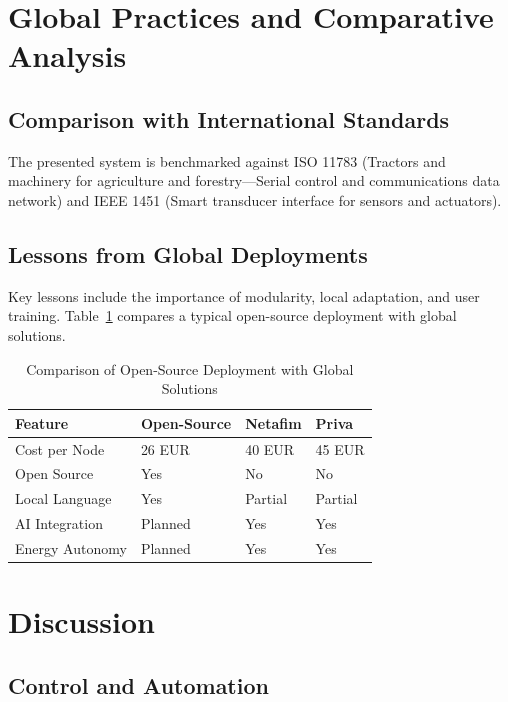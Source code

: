 \documentclass[12pt,a4paper]{article}
\begin{document}
\section{Global Practices and Comparative Analysis}
\subsection{Comparison with International Standards}
The presented system is benchmarked against ISO 11783 (Tractors and machinery for agriculture and forestry—Serial control and communications data network) and IEEE 1451 (Smart transducer interface for sensors and actuators).

\subsection{Lessons from Global Deployments}
Key lessons include the importance of modularity, local adaptation, and user training. Table~\ref{tab:compare} compares a typical open-source deployment with global solutions.

\begin{table}[H]
    \centering
    \caption{Comparison of Open-Source Deployment with Global Solutions}
    \begin{tabular}{@{}llll@{}}
    \toprule
    Feature & Open-Source & Netafim & Priva \\
    \midrule
    Cost per Node & 26 EUR & 40 EUR & 45 EUR \\
    Open Source & Yes & No & No \\
    Local Language & Yes & Partial & Partial \\
    AI Integration & Planned & Yes & Yes \\
    Energy Autonomy & Planned & Yes & Yes \\
    \bottomrule
    \end{tabular}
    \label{tab:compare}
\end{table}

\section{Discussion}
\subsection{Control and Automation}
\end{document}
